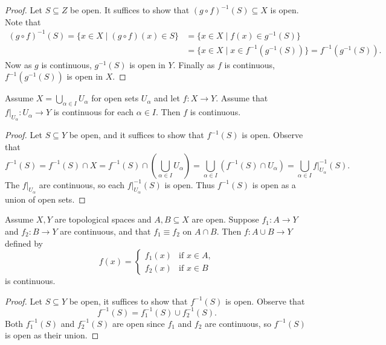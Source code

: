 \begin{proof}
  Let $S \subseteq Z$ be open. It suffices to
  show that $(g \circ f)^{-1}(S) \subseteq X$ is open.
  Note that
  \begin{align*}
    (g \circ f)^{-1}(S)
    = \{x \in X \mid (g \circ f)(x) \in S\}
    &= \{x \in X \mid f(x) \in g^{-1}(S)\} \\
    &= \{x \in X \mid x \in f^{-1}(g^{-1}(S))\}
    = f^{-1}(g^{-1}(S)).
  \end{align*}
  Now as $g$ is continuous, $g^{-1}(S)$ is open in $Y$.
  Finally as $f$ is continuous, $f^{-1}(g^{-1}(S))$ is
  open in $X$.
\end{proof}

\begin{theorem}
  Assume $X = \bigcup_{\alpha \in I} U_\alpha$
  for open sets $U_\alpha$ and let $f : X \to Y$.
  Assume that $f|_{U_\alpha} : U_\alpha \to Y$
  is continuous for each $\alpha \in I$.
  Then $f$ is continuous.
\end{theorem}

\begin{proof}
  Let $S \subseteq Y$ be open, and it suffices
  to show that $f^{-1}(S)$ is open. Observe that
  \[
    f^{-1}(S) = f^{-1}(S) \cap X
    = f^{-1}(S) \cap \left( \bigcup_{\alpha \in I} U_\alpha \right)
    = \bigcup_{\alpha \in I} (f^{-1}(S) \cap U_\alpha)
    = \bigcup_{\alpha \in I} f|_{U_\alpha}^{-1}(S).
  \]
  The $f|_{U_\alpha}$ are continuous,
  so each $f|_{U_\alpha}^{-1}(S)$ is open. Thus
  $f^{-1}(S)$ is open as a union of open sets.
\end{proof}

\begin{theorem}[Gluing]
  Assume $X, Y$ are topological spaces and
  $A, B \subseteq X$ are open. Suppose $f_1 : A \to Y$
  and $f_2 : B \to Y$ are continuous, and that
  $f_1 \equiv f_2$ on $A \cap B$. Then
  $f : A \cup B \to Y$ defined by
  \[
    f(x) =
    \begin{cases}
      f_1(x) & \text{if } x \in A, \\
      f_2(x) & \text{if } x \in B
    \end{cases}
  \]
  is continuous.
\end{theorem}

\begin{proof}
  Let $S \subseteq Y$ be open, it suffices
  to show that $f^{-1}(S)$ is open. Observe that
  \[
    f^{-1}(S) = f_1^{-1}(S) \cup f_2^{-1}(S).
  \]
  Both $f_1^{-1}(S)$ and $f_2^{-1}(S)$ are open
  since $f_1$ and $f_2$ are continuous, so
  $f^{-1}(S)$ is open as their union.
\end{proof}

